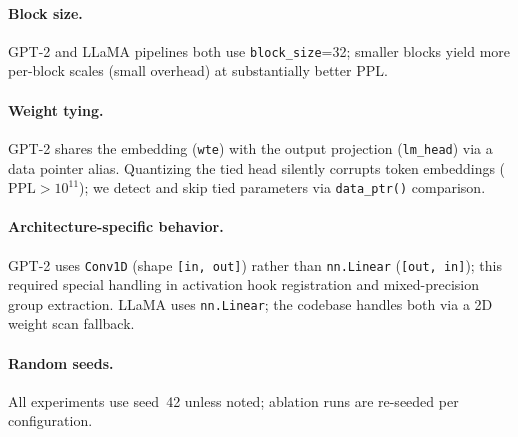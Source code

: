 \documentclass[11pt]{article}
\begin{document}
\paragraph{Block size.}
GPT-2 and LLaMA pipelines both use \texttt{block\_size}=32; smaller blocks yield more
per-block scales (small overhead) at substantially better PPL.

\paragraph{Weight tying.}
GPT-2 shares the embedding (\texttt{wte}) with the output projection (\texttt{lm\_head})
via a data pointer alias.
Quantizing the tied head silently corrupts token embeddings ($\text{PPL} > 10^{11}$);
we detect and skip tied parameters via \texttt{data\_ptr()} comparison.

\paragraph{Architecture-specific behavior.}
GPT-2 uses \texttt{Conv1D} (shape \texttt{[in, out]}) rather than \texttt{nn.Linear}
(\texttt{[out, in]}); this required special handling in activation hook registration and
mixed-precision group extraction.
LLaMA uses \texttt{nn.Linear}; the codebase handles both via a 2D weight scan fallback.

\paragraph{Random seeds.}
All experiments use seed~42 unless noted; ablation runs are re-seeded per configuration.
\end{document}
